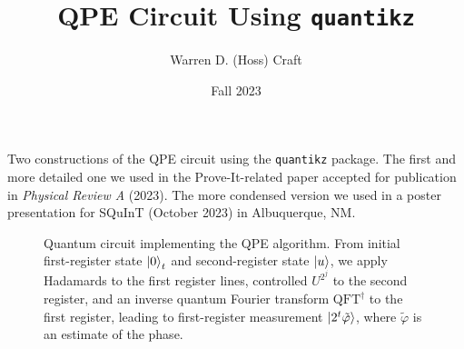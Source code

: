 \documentclass{article}
\title{QPE Circuit Using \texttt{quantikz}}
\author{Warren D. (Hoss) Craft}
\date{Fall 2023}
\begin{document}
\maketitle

\flushleft

Two constructions of the QPE circuit using the \texttt{quantikz} package. The first and more detailed one we used in the Prove-It-related paper accepted for publication in \textit{Physical Review A} (2023). The more condensed version we used in a poster presentation for SQuInT (October 2023) in Albuquerque, NM.


\begin{figure*}[htb]
    \captionsetup{font=small}
    \centerline{
    }
    \caption{Quantum circuit implementing the QPE algorithm. From initial first-register state $\ket{0}_{t}$ and second-register state $\ket{u}$, we apply Hadamards to the first register lines, controlled $U^{2^j}$ to the second register, and an inverse quantum Fourier transform $\text{QFT}^{\dagger}$ to the first register, leading to first-register measurement $\ket{2^t \tilde{\varphi}}$, where $\tilde{\varphi}$ is an estimate of the phase.}
    \label{fig:QPE_circuit}
\end{figure*}
\end{document}

